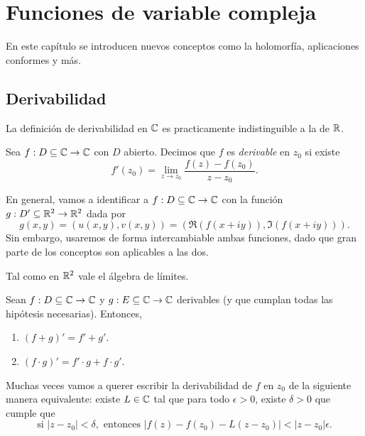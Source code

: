 \chapter{Funciones de variable compleja}

En este capítulo se introducen nuevos conceptos como la holomorfía, aplicaciones conformes y más.

\section{Derivabilidad}

La definición de derivabilidad en $\mathbb{C}$ es practicamente indistinguible a la de $\mathbb{R}$.

\begin{definition}
    Sea $f : D \subseteq \mathbb{C} \to \mathbb{C}$ con $D$ abierto. Decimos que $f$ es \emph{derivable} en $z_0$ si existe
    \begin{equation*}
        f'(z_0) = \lim_{z \to z_0} \frac{f(z) - f(z_0)}{z - z_0}.
    \end{equation*}
\end{definition}

En general, vamos a identificar a $f: D \subseteq \mathbb{C} \to \mathbb{C}$ con la función $g: D' \subseteq \mathbb{R}^2 \to \mathbb{R}^2$ dada por
\begin{equation*}
    g(x, y) = (u(x, y), v(x, y)) = (\Re(f(x + iy)), \Im(f(x + iy))).
\end{equation*}
Sin embargo, usaremos de forma intercambiable ambas funciones, dado que gran parte de los conceptos son aplicables a las dos.

Tal como en $\mathbb{R}^2$ vale el álgebra de límites.

\begin{proposition}
    Sean $f: D \subseteq \mathbb{C} \to \mathbb{C}$ y $g: E \subseteq \mathbb{C} \to \mathbb{C}$ derivables (y que cumplan todas las hipótesis necesarias). Entonces,
    \begin{enumerate}
        \item $(f + g)' = f' + g'$.
        \item $(f \cdot g)' = f' \cdot g + f \cdot g'$.
    \end{enumerate}
\end{proposition}

Muchas veces vamos a querer escribir la derivabilidad de $f$ en $z_0$ de la siguiente manera equivalente: existe $L \in \mathbb{C}$ tal que para todo $\epsilon > 0$, existe $\delta > 0$ que cumple que 
\begin{equation*}
    \text{si } |z - z_0| < \delta, \text{ entonces } |f(z) - f(z_0) - L(z - z_0)| < |z - z_0| \epsilon.
\end{equation*}

